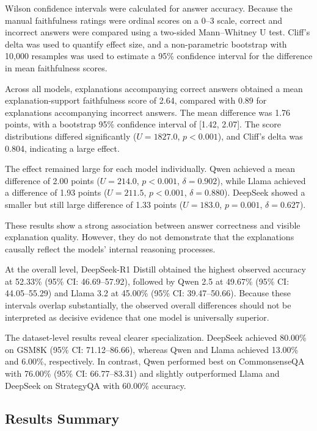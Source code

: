 \documentclass{article}
\begin{document}
Wilson confidence intervals were calculated for answer accuracy.
Because the manual faithfulness ratings were ordinal scores on a
0--3 scale, correct and incorrect answers were compared using a
two-sided Mann--Whitney U test. Cliff's delta was used to quantify
effect size, and a non-parametric bootstrap with 10,000 resamples
was used to estimate a 95\% confidence interval for the difference
in mean faithfulness scores.

Across all models, explanations accompanying correct answers obtained
a mean explanation-support faithfulness score of 2.64, compared with
0.89 for explanations accompanying incorrect answers. The mean
difference was 1.76 points, with a bootstrap 95\% confidence interval
of [1.42, 2.07]. The score distributions differed significantly
($U=1827.0$, $p<0.001$), and Cliff's delta was 0.804, indicating a
large effect.

The effect remained large for each model individually. Qwen achieved
a mean difference of 2.00 points
($U=214.0$, $p<0.001$, $\delta=0.902$), while Llama achieved a
difference of 1.93 points
($U=211.5$, $p<0.001$, $\delta=0.880$). DeepSeek showed a smaller but
still large difference of 1.33 points
($U=183.0$, $p=0.001$, $\delta=0.627$).

These results show a strong association between answer correctness
and visible explanation quality. However, they do not demonstrate
that the explanations causally reflect the models' internal reasoning
processes.

At the overall level, DeepSeek-R1 Distill obtained the highest observed
accuracy at 52.33\% (95\% CI: 46.69--57.92), followed by Qwen 2.5 at
49.67\% (95\% CI: 44.05--55.29) and Llama 3.2 at 45.00\%
(95\% CI: 39.47--50.66). Because these intervals overlap substantially,
the observed overall differences should not be interpreted as decisive
evidence that one model is universally superior.

The dataset-level results reveal clearer specialization. DeepSeek
achieved 80.00\% on GSM8K (95\% CI: 71.12--86.66), whereas Qwen and
Llama achieved 13.00\% and 6.00\%, respectively. In contrast, Qwen
performed best on CommonsenseQA with 76.00\%
(95\% CI: 66.77--83.31) and slightly outperformed Llama and DeepSeek
on StrategyQA with 60.00\% accuracy.

\subsection{Results Summary}
\end{document}
